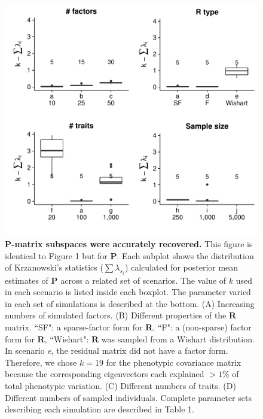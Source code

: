 \documentclass[12pt,titlepage]{article}
\begin{document}
\setcounter{figure}{0}
\makeatletter 
\renewcommand{\thefigure}{S\@arabic\c@figure}
\begin{figure}[b]
\begin{center}
\includegraphics[width=5in]{Figures/K_dists_P.pdf}
\caption[Krzanowski substance comparison statistics for P by scenario]{ \textbf{$\mathbf{P}$-matrix subspaces were accurately recovered.} This figure is identical to Figure 1 but for $\mathbf{P}$. Each subplot shows the distribution of Krzanowski's statistics ($\sum \lambda_{s_i}$) calculated for posterior mean estimates of $\mathbf{P}$ across a related set of scenarios. The value of $k$ used in each scenario is listed inside each boxplot. The parameter varied in each set of simulations is described at the bottom. (A) Increasing numbers of simulated factors. (B) Different properties of the $\mathbf{R}$ matrix. ``SF": a sparse-factor form for $\mathbf{R}$, ``F": a (non-sparse) factor form for $\mathbf{R}$, ``Wishart": $\mathbf{R}$ was sampled from a Wishart distribution. In scenario \emph{e}, the residual matrix did not have a factor form. Therefore, we chose $k=19$ for the phenotypic covariance matrix because the corresponding eigenvectors each explained $>1\%$ of total phenotypic variation. (C) Different numbers of traits. (D) Different numbers of sampled individuals. Complete parameter sets describing each simulation are described in Table 1.}
\label{fig:Krzanowski_P}
\end{center}
\end{figure}
\end{document}
